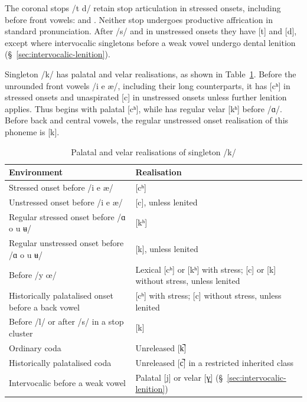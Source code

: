 The coronal stops /t d/ retain stop articulation in stressed onsets, including before front vowels:  and . Neither stop undergoes productive affrication in standard pronunciation. After /s/ and in unstressed onsets they have [t] and [d], except where intervocalic singletons before a weak vowel undergo dental lenition (\S~\ref{sec:intervocalic-lenition}).

Singleton /k/ has palatal and velar realisations, as shown in Table~\ref{tab:k-realisations}. Before the unrounded front vowels /i e æ/, including their long counterparts, it has [cʰ] in stressed onsets and unaspirated [c] in unstressed onsets unless further lenition applies. Thus  begins with palatal [cʰ], while  has regular velar [kʰ] before /ɑ/. Before back and central vowels, the regular unstressed onset realisation of this phoneme is [k].

\begin{table}[!ht]
    \caption{Palatal and velar realisations of singleton /k/}
    \label{tab:k-realisations}
    \small
    \begin{tabularx}{\textwidth}{X X}
        \toprule
        \rowcolor{grammarTableHead}
        \textbf{Environment} & \textbf{Realisation} \\
        \midrule
        Stressed onset before /i e æ/ & [cʰ] \\
        Unstressed onset before /i e æ/ & [c], unless lenited \\
        Regular stressed onset before /ɑ o u ʉ/ & [kʰ] \\
        Regular unstressed onset before /ɑ o u ʉ/ & [k], unless lenited \\
        Before /y œ/ & Lexical [cʰ] or [kʰ] with stress; [c] or [k] without stress, unless lenited \\
        Historically palatalised onset before a back vowel & [cʰ] with stress; [c] without stress, unless lenited \\
        Before /l/ or after /s/ in a stop cluster & [k] \\
        Ordinary coda & Unreleased [k̚] \\
        Historically palatalised coda & Unreleased [c̚] in a restricted inherited class \\
        Intervocalic before a weak vowel & Palatal [j] or velar [ɣ̞] (\S~\ref{sec:intervocalic-lenition}) \\
        \bottomrule
    \end{tabularx}
\end{table}

